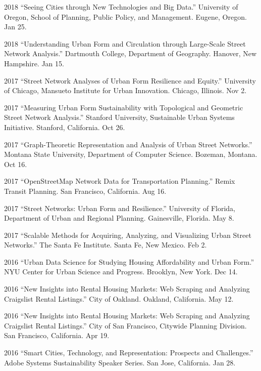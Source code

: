 \documentclass[12pt,letterpaper]{report}
\begin{document}
\begin{tablist}
		\item[2018] \tab \enquote{Seeing Cities through New Technologies and Big Data.} University of Oregon, School of Planning, Public Policy, and Management. Eugene, Oregon. Jan 25.
		
		\item[2018] \tab \enquote{Understanding Urban Form and Circulation through Large-Scale Street Network Analysis.} Dartmouth College, Department of Geography. Hanover, New Hampshire. Jan 15.
		
		\item[2017] \tab \enquote{Street Network Analyses of Urban Form Resilience and Equity.} University of Chicago, Mansueto Institute for Urban Innovation. Chicago, Illinois. Nov 2.
		
		\item[2017] \tab \enquote{Measuring Urban Form Sustainability with Topological and Geometric Street Network Analysis.} Stanford University, Sustainable Urban Systems Initiative. Stanford, California. Oct 26.
		
		\item[2017] \tab \enquote{Graph-Theoretic Representation and Analysis of Urban Street Networks.} Montana State University, Department of Computer Science. Bozeman, Montana. Oct 16.
		
		\item[2017] \tab \enquote{OpenStreetMap Network Data for Transportation Planning.} Remix Transit Planning. San Francisco, California. Aug 16.
		
		\item[2017] \tab \enquote{Street Networks: Urban Form and Resilience.} University of Florida, Department of Urban and Regional Planning. Gainesville, Florida. May 8.
		
		\item[2017] \tab \enquote{Scalable Methods for Acquiring, Analyzing, and Visualizing Urban Street Networks.} The Santa Fe Institute. Santa Fe, New Mexico. Feb 2.
		
		\item[2016] \tab \enquote{Urban Data Science for Studying Housing Affordability and Urban Form.} NYU Center for Urban Science and Progress. Brooklyn, New York. Dec 14.
		
		\item[2016] \tab \enquote{New Insights into Rental Housing Markets: Web Scraping and Analyzing Craigslist Rental Listings.} City of Oakland. Oakland, California. May 12.
		
		\item[2016] \tab \enquote{New Insights into Rental Housing Markets: Web Scraping and Analyzing Craigslist Rental Listings.} City of San Francisco, Citywide Planning Division. San Francisco, California. Apr 19.
		
		\item[2016] \tab \enquote{Smart Cities, Technology, and Representation: Prospects and Challenges.} Adobe Systems Sustainability Speaker Series. San Jose, California. Jan 28.
		
	\end{tablist}
	
\end{document}
